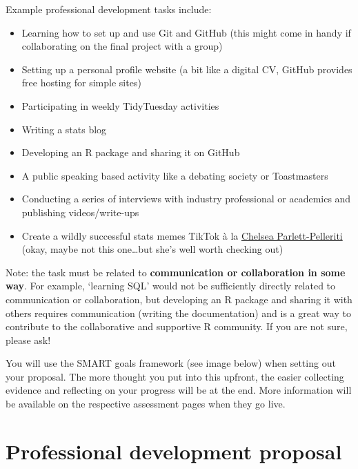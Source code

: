 \documentclass[
  openany]{book}
\begin{document}
Example professional development tasks include:

\begin{itemize}
\item
  Learning how to set up and use Git and GitHub (this might come in handy if collaborating on the final project with a group)
\item
  Setting up a personal profile website (a bit like a digital CV, GitHub provides free hosting for simple sites)
\item
  Participating in weekly TidyTuesday activities
\item
  Writing a stats blog
\item
  Developing an R package and sharing it on GitHub
\item
  A public speaking based activity like a debating society or Toastmasters
\item
  Conducting a series of interviews with industry professional or academics and publishing videos/write-ups
\item
  Create a wildly successful stats memes TikTok à la \href{https://www.tiktok.com/@chelseaparlettpelleriti/video/6811647290709757189?u_code=d894729j1bcal8\&preview_pb=0\&language=en\&timestamp=1585960235\&user_id=6736543492652696582\&utm_campaign=client_share\&app=musically\&utm_medium=ios\&user_id=6736543492652696582\&tt_from=twitter\&utm_source=twitter\&source=h5_m}{Chelsea Parlett-Pelleriti} (okay, maybe not this one\ldots but she's well worth checking out)
\end{itemize}

Note: the task must be related to \textbf{communication or collaboration in some way}. For example, `learning SQL' would not be sufficiently directly related to communication or collaboration, but developing an R package and sharing it with others requires communication (writing the documentation) and is a great way to contribute to the collaborative and supportive R community. If you are not sure, please ask!

You will use the SMART goals framework (see image below) when setting out your proposal. The more thought you put into this upfront, the easier collecting evidence and reflecting on your progress will be at the end. More information will be available on the respective assessment pages when they go live.

\hypertarget{professional-development-proposal}{%
\section{Professional development proposal}\label{professional-development-proposal}}
\end{document}
